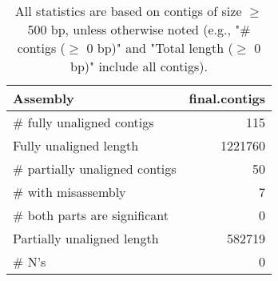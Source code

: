 \documentclass[12pt,a4paper]{article}
\begin{document}
\begin{table}[ht]
\begin{center}
\caption{All statistics are based on contigs of size $\geq$ 500 bp, unless otherwise noted (e.g., "\# contigs ($\geq$ 0 bp)" and "Total length ($\geq$ 0 bp)" include all contigs).}
\begin{tabular}{|l*{1}{|r}|}
\hline
Assembly & final.contigs \\ \hline
\# fully unaligned contigs & 115 \\ \hline
Fully unaligned length & 1221760 \\ \hline
\# partially unaligned contigs & 50 \\ \hline
\hspace{5mm}\# with misassembly & 7 \\ \hline
\hspace{5mm}\# both parts are significant & 0 \\ \hline
Partially unaligned length & 582719 \\ \hline
\# N's & 0 \\ \hline
\end{tabular}
\end{center}
\end{table}
\end{document}

